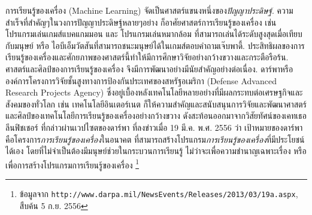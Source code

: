 การเรียนรู้ของเครื่อง (Machine Learning) จัดเป็นศาสตร์แขนงหนึ่งของ\textit{ปัญญาประดิษฐ์}. 
ความสำเร็จที่สำคัญๆในวงการปัญญาประดิษฐ์หลายๆอย่าง ก็อาศัยศาสตร์การเรียนรู้ของเครื่อง เช่น โปรแกรมเล่นเกมส์แบคแกมมอน\cite{TDGammon} และ โปรแกรมเล่นหมากล้อม\cite{SilverEtAl2016a} ที่สามารถเล่นได้ระดับสูงสุดเมื่อเทียบกับมนุษย์ 
หรือ ไอบีเอ็มวัตสันที่สามารถชนะมนุษย์ได้ในเกมส์ตอบคำถามเจ๊บพาดี้\cite{Abu-Mostafa2012a}.
%
ประสิทธิผลของการเรียนรู้ของเครื่องและศักยภาพของศาสตร์นี้ทำให้มีการศึกษาวิจัยอย่างกว้างขวางและกระตือรือร้น.
ศาสตร์และศิลป์ของการเรียนรู้ของเครื่อง จึงมีการพัฒนาอย่างมีนัยสำคัญอย่างต่อเนื่อง. 
%
ดาร์พาหรือองค์การโครงการวิจัยชั้นสูงทางการป้องกันประเทศของสหรัฐอเมริกา
(Defense Advanced Research Projects Agency) 
ซึ่งอยู่เบื้องหลังเทคโนโลยีหลายอย่างที่มีผลกระทบต่อเศรษฐกิจและสังคมของทั่วโลก เช่น เทคโนโลยีอินเตอร์เนต 
ก็ให้ความสำคัญและสนับสนุนการวิจัยและพัฒนาศาสตร์และศิลป์ของเทคโนโลยีการเรียนรู้ของเครื่องอย่างกว้างขวาง 
ดังสะท้อนออกมาจากวิสัยทัศน์ของเคทเธอลีนฟิชเชอร์
ที่กล่าวผ่านเวปไซตของดาร์พา ที่ลงข่าวเมื่อ 19 มี.ค. พ.ศ. 2556 ว่า 
เป้าหมายของดาร์พาคือโครงการ\textit{การเรียนรู้ของเครื่อง}ในอนาคต ที่สามารถสร้างโปรแกรม\textit{การเรียนรู้ของเครื่อง}ที่มีประโยชน์ได้เอง โดยที่ไม่จำเป็นต้องมีมนุษย์ช่วยในกระบวนการเรียนรู้ ไม่ว่าจะเพื่อความชำนาญเฉพาะเรื่อง หรือ เพื่อการสร้างโปรแกรมการเรียนรู้ของเครื่อง%
\footnote{ข้อมูลจาก \texttt{http://www.darpa.mil/NewsEvents/Releases/2013/03/19a.aspx}, สืบค้น 5 ก.ย. 2556}
%

